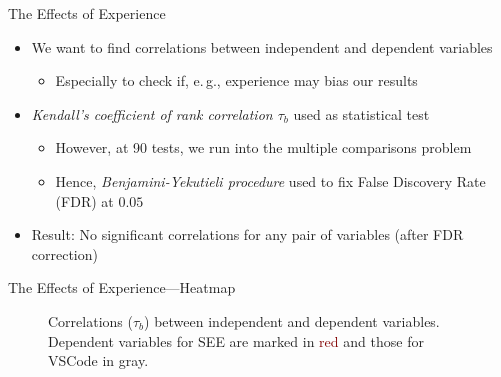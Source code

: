 \documentclass[xcolor={dvipsnames},aspectratio=169,compress,final]{beamer}
\begin{document}
\begin{frame}{The Effects of Experience}
	\begin{itemize}
		\item We want to find correlations between independent and dependent variables
		      \begin{itemize}
			      \item Especially to check if, e.\,g., experience may bias our results
		      \end{itemize}
		\item \emph{Kendall's coefficient of rank correlation $\tau_b$} used as statistical test
		      \begin{itemize}
			      \item However, at 90 tests, we run into the multiple comparisons problem
			      \item Hence, \emph{Benjamini-Yekutieli procedure} used to fix False Discovery Rate (FDR) at $0.05$
		      \end{itemize}
		\item Result: No significant correlations for any pair of variables (after FDR correction)
	\end{itemize}
\end{frame}

\begin{frame}{The Effects of Experience---Heatmap}
	\begin{figure}
		\begin{center}
		\end{center}
		\caption{Correlations ($\tau_b$) between independent and dependent variables.
			Dependent variables for SEE are marked in \textcolor{Maroon}{red} and those for VSCode in \textcolor{Gray!50!black}{gray}.}
	\end{figure}
\end{frame}
\end{document}

